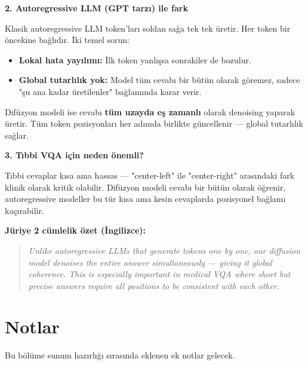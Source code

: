 \documentclass[12pt, a4paper]{article}
\begin{document}
\textbf{2. Autoregressive LLM (GPT tarzı) ile fark}

Klasik autoregressive LLM token'ları soldan sağa tek tek üretir. Her token bir öncekine bağlıdır. İki temel sorun:
\begin{itemize}
  \item \textbf{Lokal hata yayılımı:} İlk token yanlışsa sonrakiler de bozulur.
  \item \textbf{Global tutarlılık yok:} Model tüm cevabı bir bütün olarak göremez, sadece "şu ana kadar üretilenler" bağlamında karar verir.
\end{itemize}

Difüzyon modeli ise cevabı \textbf{tüm uzayda eş zamanlı} olarak denoising yaparak üretir. Tüm token pozisyonları her adımda birlikte güncellenir — global tutarlılık sağlar.

\textbf{3. Tıbbi VQA için neden önemli?}

Tıbbi cevaplar kısa ama hassas — "center-left" ile "center-right" arasındaki fark klinik olarak kritik olabilir. Difüzyon modeli cevabı bir bütün olarak öğrenir, autoregressive modeller bu tür kısa ama kesin cevaplarda pozisyonel bağlamı kaçırabilir.

\textbf{Jüriye 2 cümlelik özet (İngilizce):}
\begin{quote}
\itshape
Unlike autoregressive LLMs that generate tokens one by one, our diffusion model denoises the entire answer simultaneously — giving it global coherence. This is especially important in medical VQA where short but precise answers require all positions to be consistent with each other.
\end{quote}

\section{Notlar}

Bu bölüme sunum hazırlığı sırasında eklenen ek notlar gelecek.
\end{document}
